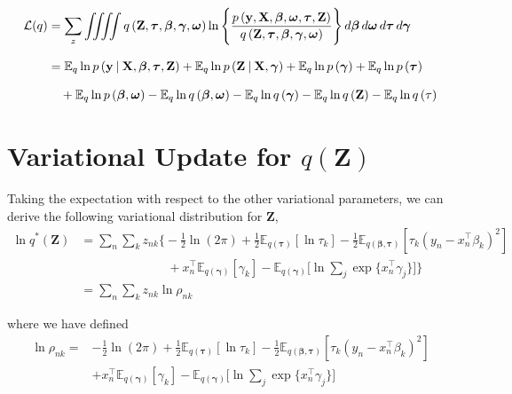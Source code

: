 \documentclass[twoside,11pt]{article}
\newcommand{\tr}{\intercal}
\newcommand\given[1][]{\:#1\vert\:}
\newcommand{\boldbeta}{\boldsymbol\beta}
\newcommand{\boldgamma}{\boldsymbol\gamma}
\newcommand{\boldomega}{\boldsymbol\omega}
\newcommand{\boldtau}{\boldsymbol\tau}
\newcommand{\E}{\mathbb{E}}
\begin{document}
\begin{equation} \label{eq:ELBO}
\setlength{\jot}{11pt}
\begin{split}
	\mathcal{L}(q) &= \sum_{z} \iiiint q\left(\mathbf{Z}, \boldtau, \boldbeta, \boldgamma, \boldsymbol \omega\right)
	\ln \Bigg\{ \frac{p\left(\mathbf{y}, \mathbf{X}, \boldbeta, \boldsymbol\omega, \boldtau, \mathbf{Z}\right)}{q \left(\mathbf{Z}, \boldtau, \boldbeta, \boldgamma, \boldsymbol \omega \right)}\Bigg\}\, d\boldbeta\, d\boldsymbol\omega\, d\boldtau\, d\boldgamma \\
	&= \E_q \ln p\left( \mathbf{y} \given \mathbf{X}, \boldbeta, \boldtau, \mathbf{Z} \right) + \E_q \ln p\left( \mathbf{Z} \given \mathbf{X}, \boldgamma \right) + \E_q \ln p\left( \boldgamma \right) + \E_q \ln p\left( \boldtau \right) \\ & \quad + \E_q \ln p\left( \boldbeta, \boldomega \right) - \E_q \ln q\left( \boldbeta, \boldomega \right) - 
	\E_q \ln q\left( \boldgamma \right) - \E_q \ln q\left( \mathbf{Z} \right) - \E_q \ln q\left( \mathbf{\tau} \right)
\end{split}
\end{equation}



\newpage

\appendix
\section{Variational Update for $q(\mathbf{Z})$} 
\label{app:q_z}

Taking the expectation with respect to the other variational parameters, we can derive the following variational distribution for $\mathbf{Z}$,
\begin{align*}
	\ln q^{*}(\mathbf{Z}) &= \sum_n \sum_k z_{nk} \Bigg\{  -\frac{1}{2}\ln(2\pi) + \frac{1}{2} \E_{q(\boldsymbol\tau)}[ \ln \tau_k ] - \frac{1}{2} \E_{q(\boldsymbol\beta, \boldsymbol\tau)}[\tau_k (y_n - x_n^{\tr}\beta_k)^2] \\ 
	&\qquad \qquad \qquad \quad + x_n^{\tr}\E_{q(\boldsymbol\gamma)}[\gamma_k] - \E_{q(\boldsymbol\gamma)}\Bigg[\ln \sum_{j} \exp \{ x_n^{\tr} \gamma_j \}\Bigg]\Bigg\} \\
	&= \sum_n \sum_k z_{nk} \ln \rho_{nk}
\end{align*}

where we have defined 
\begin{equation} \label{eq:ln_rho}
\begin{split}
 \ln \rho_{nk} = &-\frac{1}{2}\ln(2\pi) + \frac{1}{2} \E_{q(\boldsymbol\tau)}[ \ln \tau_k ] - \frac{1}{2} \E_{q(\boldsymbol\beta, \boldsymbol\tau)}[\tau_k (y_n - x_n^{\tr}\beta_k)^2] \\ 
	& + x_n^{\tr}\E_{q(\boldsymbol\gamma)}[\gamma_k] - \E_{q(\boldsymbol\gamma)}\Bigg[\ln \sum_{j} \exp \{ x_n^{\tr} \gamma_j \} \Bigg]
\end{split}
\end{equation}
\end{document}
